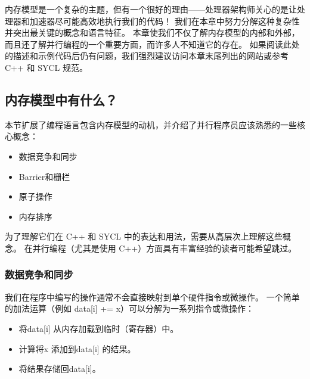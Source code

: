 内存模型是一个复杂的主题，但有一个很好的理由——处理器架构师关心的是让处理器和加速器尽可能高效地执行我们的代码！ 
我们在本章中努力分解这种复杂性并突出最关键的概念和语言特征。 
本章使我们不仅了解内存模型的内部和外部，而且还了解并行编程的一个重要方面，而许多人不知道它的存在。 
如果阅读此处的描述和示例代码后仍有问题，我们强烈建议访问本章末尾列出的网站或参考 C++ 和 SYCL 规范。

\subsection{内存模型中有什么？}
本节扩展了编程语言包含内存模型的动机，并介绍了并行程序员应该熟悉的一些核心概念：

\begin{itemize}
	\item 数据竞争和同步

	\item Barrier和栅栏

	\item 原子操作

	\item 内存排序
\end{itemize}

为了理解它们在 C++ 和 SYCL 中的表达和用法，需要从高层次上理解这些概念。 
在并行编程（尤其是使用 C++）方面具有丰富经验的读者可能希望跳过。

\subsubsection{数据竞争和同步}
我们在程序中编写的操作通常不会直接映射到单个硬件指令或微操作。 
一个简单的加法运算（例如 data[i] += x）可以分解为一系列指令或微操作：

\begin{itemize}
	\item 将data[i] 从内存加载到临时（寄存器）中。

	\item 计算将x 添加到data[i] 的结果。

	\item 将结果存储回data[i]。
\end{itemize}

